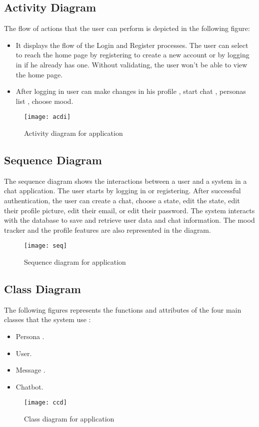 
    \subsection{Activity Diagram }
    The flow of actions that the user can perform is depicted in the following figure: 
    \begin{itemize}
        \item  It displays the flow of the Login and Register processes. The user can select to reach the home page by registering to create a new account or by logging in if he already has one. Without validating, the user won't be able to view the home page.
        \item  After logging in user can make changes in his profile , start chat , personas list , choose mood.
     
    \end{itemize}
    
    \begin{figure}[h]
        \texttt{[image: acdi]}
        \caption{Activity diagram for application}
        \centering
        \end{figure}
    


      \subsection{Sequence Diagram }
      The sequence diagram shows the interactions between a user and a system in a chat application. The user starts by logging in or registering. After successful authentication, the user can create a chat, choose a state, edit the state, edit their profile picture, edit their email, or edit their password. The system interacts with the database to save and retrieve user data and chat information. The mood tracker and the profile features are also represented in the diagram.
    
    
            \begin{figure}[h]
                \texttt{[image: seq]}
                \caption{Sequence diagram for application}
                \centering
                \end{figure}
 \subsection{Class Diagram }
 The following figures represents the functions and attributes of the four main classes that the system use :
 \begin{itemize}
 \item  Persona .
 \item  User.
 \item  Message .
 \item  Chatbot.
\end{itemize}
  \begin{figure}[h]
       \texttt{[image: ccd]}
     \caption{Class diagram for application}
     \centering
    \end{figure}
          
